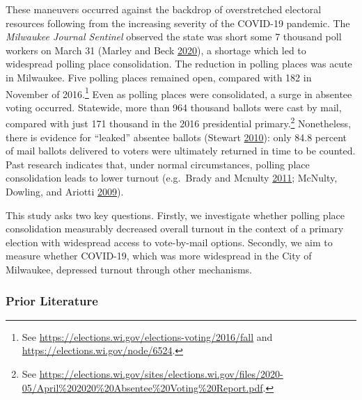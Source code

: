 \documentclass[
  12pt,
]{article}
\begin{document}
These maneuvers occurred against the backdrop of overstretched electoral resources following from the increasing severity of the COVID-19 pandemic. The \emph{Milwaukee Journal Sentinel} observed the state was short some 7 thousand poll workers on March 31 (Marley and Beck \protect\hyperlink{ref-Marley2020}{2020}), a shortage which led to widespread polling place consolidation. The reduction in polling places was acute in Milwaukee. Five polling places remained open, compared with 182 in November of 2016.\footnote{See \url{https://elections.wi.gov/elections-voting/2016/fall} and \url{https://elections.wi.gov/node/6524}.} Even as polling places were consolidated, a surge in absentee voting occurred. Statewide, more than 964 thousand ballots were cast by mail, compared with just 171 thousand in the 2016 presidential primary.\footnote{See \url{https://elections.wi.gov/sites/elections.wi.gov/files/2020-05/April\%202020\%20Absentee\%20Voting\%20Report.pdf}.} Nonetheless, there is evidence for ``leaked'' absentee ballots (Stewart \protect\hyperlink{ref-Stewart2010}{2010}): only 84.8 percent of mail ballots delivered to voters were ultimately returned in time to be counted. Past research indicates that, under normal circumstances, polling place consolidation leads to lower turnout (e.g.~Brady and Mcnulty \protect\hyperlink{ref-Brady2011}{2011}; McNulty, Dowling, and Ariotti \protect\hyperlink{ref-McNulty2009}{2009}).

This study asks two key questions. Firstly, we investigate whether polling place consolidation measurably decreased overall turnout in the context of a primary election with widespread access to vote-by-mail options. Secondly, we aim to measure whether COVID-19, which was more widespread in the City of Milwaukee, depressed turnout through other mechanisms.

\hypertarget{prior-literature}{%
\subsubsection*{Prior Literature}\label{prior-literature}}
\end{document}
